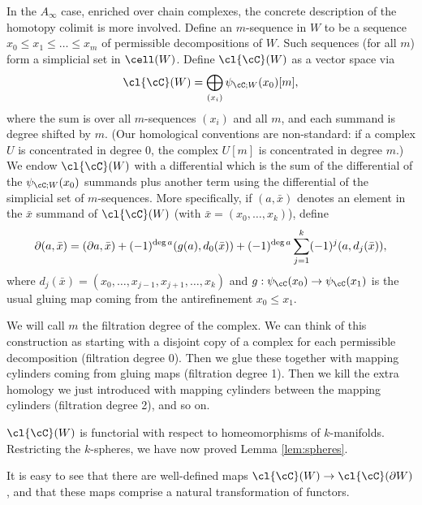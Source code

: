 In the $A_\infty$ case, enriched over chain complexes, the concrete description of the homotopy colimit
is more involved.
Define an $m$-sequence in $W$ to be a sequence $x_0 \le x_1 \le \dots \le x_m$ of permissible decompositions of $W$.
Such sequences (for all $m$) form a simplicial set in $\cell(W)$.
Define $\cl{\cC}(W)$ as a vector space via
\[
	\cl{\cC}(W) = \bigoplus_{(x_i)} \psi_{\cC;W}(x_0)[m] ,
\]
where the sum is over all $m$-sequences $(x_i)$ and all $m$, and each summand is degree shifted by $m$. 
(Our homological conventions are non-standard: if a complex $U$ is concentrated in degree $0$, 
the complex $U[m]$ is concentrated in degree $m$.)
We endow $\cl{\cC}(W)$ with a differential which is the sum of the differential of the $\psi_{\cC;W}(x_0)$
summands plus another term using the differential of the simplicial set of $m$-sequences.
More specifically, if $(a, \bar{x})$ denotes an element in the $\bar{x}$
summand of $\cl{\cC}(W)$ (with $\bar{x} = (x_0,\dots,x_k)$), define
\[
	\partial (a, \bar{x}) = (\partial a, \bar{x}) + (-1)^{\deg{a}} (g(a), d_0(\bar{x})) + (-1)^{\deg{a}} \sum_{j=1}^k (-1)^{j} (a, d_j(\bar{x})) ,
\]
where $d_j(\bar{x}) = (x_0,\dots,x_{j-1},x_{j+1},\dots,x_k)$ and $g: \psi_\cC(x_0)\to \psi_\cC(x_1)$
is the usual gluing map coming from the antirefinement $x_0 \le x_1$.

We will call $m$ the filtration degree of the complex.
We can think of this construction as starting with a disjoint copy of a complex for each
permissible decomposition (filtration degree 0).
Then we glue these together with mapping cylinders coming from gluing maps
(filtration degree 1).
Then we kill the extra homology we just introduced with mapping 
cylinders between the mapping cylinders (filtration degree 2), and so on.

$\cl{\cC}(W)$ is functorial with respect to homeomorphisms of $k$-manifolds. Restricting the $k$-spheres, we have now proved Lemma \ref{lem:spheres}.

It is easy to see that
there are well-defined maps $\cl{\cC}(W)\to\cl{\cC}(\bd W)$, and that these maps
comprise a natural transformation of functors.

